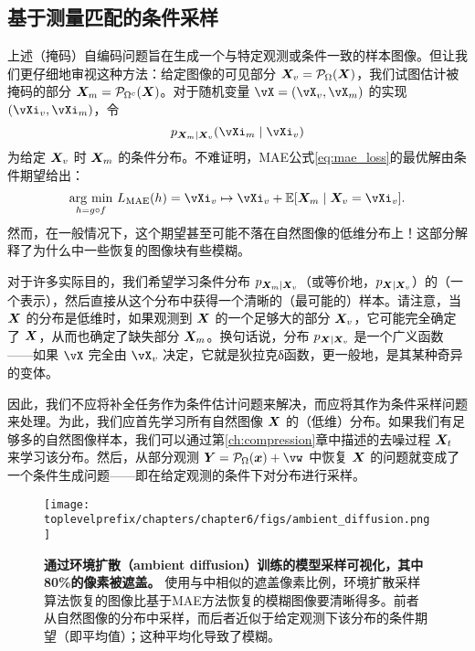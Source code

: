 \documentclass[../../book-main_zh.tex]{subfiles}
\begin{document}
\subsection{基于测量匹配的条件采样}
\label{sec:conditioned-decoding}
上述（掩码）自编码问题旨在生成一个与特定观测或条件一致的样本图像。但让我们更仔细地审视这种方法：给定图像的可见部分 $\bm{X}_v = \mathcal{P}_{\Omega}(\bm{X})$，我们试图估计被掩码的部分 $\bm{X}_m = \mathcal{P}_{\Omega^c}(\bm{X})$。对于随机变量 $\vX=(\vX_v, \vX_m)$ 的实现 $(\vXi_v, \vXi_m)$，令
\[p_{\X_m \mid \X_v}(\vXi_m\mid \vXi_v)\]
为给定 $\bm{X}_v$ 时 $\bm{X}_m$ 的条件分布。不难证明，MAE公式\eqref{eq:mae_loss}的最优解由条件期望给出：
\begin{equation}
  \argmin_{h = g \circ f}\, L_{\mathrm{MAE}}(h)
  = \vXi_v \mapsto \vXi_v + \mathbb{E}[\X_m \mid \X_v=\vXi_v].
\end{equation}
然而，在一般情况下，这个期望甚至可能不落在自然图像的低维分布上！这部分解释了为什么中一些恢复的图像块有些模糊。

对于许多实际目的，我们希望学习条件分布 $p_{\bm{X}_m \mid \bm{X}_v}$（或等价地，$p_{\bm{X} \mid \bm{X}_v}$）的（一个表示），然后直接从这个分布中获得一个清晰的（最可能的）样本。请注意，当 $\bm{X}$ 的分布是低维时，如果观测到 $\bm{X}$ 的一个足够大的部分 $\bm{X}_v$，它可能完全确定了 $\bm{X}$，从而也确定了缺失部分 $\bm{X}_m$。换句话说，分布 $p_{\bm{X} \mid \bm{X}_v}$ 是一个广义函数——如果 $\vX$ 完全由 $\vX_v$ 决定，它就是狄拉克δ函数，更一般地，是其某种奇异的变体。

因此，我们不应将补全任务作为条件估计问题来解决，而应将其作为条件采样问题来处理。为此，我们应首先学习所有自然图像 $\bm{X}$ 的（低维）分布。如果我们有足够多的自然图像样本，我们可以通过第\ref{ch:compression}章中描述的去噪过程 $\bm{X}_t$ 来学习该分布。然后，从部分观测 $\Y = \mathcal{P}_\Omega(\x) +\vw$ 中恢复 $\bm{X}$ 的问题就变成了一个条件生成问题——即在给定观测的条件下对分布进行采样。

\begin{figure}
  \centering
  \texttt{[image: \\toplevelprefix/chapters/chapter6/figs/ambient\_diffusion.png]}
  \caption{\small \textbf{通过环境扩散（ambient diffusion）\cite{Daras-NIPS2023}训练的模型采样可视化，其中80\%的像素被遮盖。} 使用与中相似的遮盖像素比例，环境扩散采样算法恢复的图像比基于MAE方法恢复的模糊图像要清晰得多。前者从自然图像的分布中采样，而后者近似于给定观测下该分布的条件期望（即平均值）；这种平均化导致了模糊。}
  \label{fig:ambient_diffusion}
\end{figure}
\end{document}

